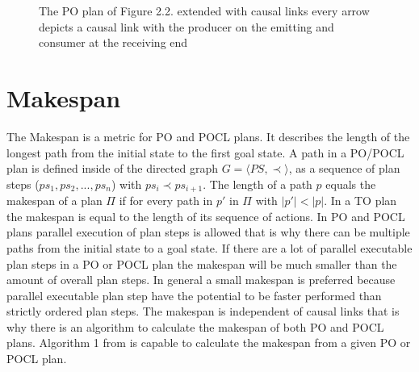 \begin{figure}[h]

\caption{The PO plan of Figure 2.2. extended with causal links\newline
every arrow depicts a causal link with the producer on the emitting and consumer at the receiving end}
\end{figure}

\section{Makespan}

The Makespan is a metric for PO and POCL plans. It describes the length of the longest path from the initial state to the first goal state.
A path in a PO/POCL plan is defined inside of the directed graph $G=\langle PS, \prec \rangle$, as a sequence of plan steps ($ps_1,ps_2,...,ps_n$)
with $ps_i \prec ps_{i+1}$.
The length of a path $p$ equals the makespan of a plan $\Pi$ if for every path in $p'$ in $\Pi$ with $\vert p' \vert < \vert p \vert$.
In a TO plan the makespan is equal to the length of its sequence of actions.
In PO and POCL plans parallel execution of plan steps is allowed that is why there can be multiple paths from the initial state to a goal state. 
If there are a lot of parallel executable plan steps in a PO or POCL plan the makespan will be much smaller than the amount of overall plan steps. 
In general a small makespan is preferred because parallel executable plan step have the potential to be faster performed than strictly ordered plan steps.
The makespan is independent of causal links that is why there is an algorithm to calculate the makespan of both PO and POCL plans.
Algorithm 1 from \cite{Backstrom} is capable to calculate the makespan from a given PO or POCL plan. 

